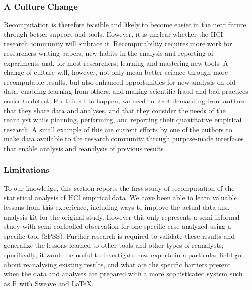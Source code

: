 \subsubsection{A Culture Change}
Recomputation is therefore feasible and likely to become easier in the near future through better support and tools. However, it is unclear whether the HCI research community will embrace it. Recomputability requires more work for researchers writing papers, new habits in the analysis and reporting of experiments and, for most researchers, learning and mastering new tools. A change of culture will, however, not only mean better science through more recomputable results, but also enhanced opportunities for new analysis on old data, enabling learning from others, and making scientific fraud and bad practices easier to detect. For this all to happen, we need to start demanding from authors that they share data and analyses, and that they consider the needs of the reanalyst while planning, performing, and reporting their quantitative empirical research. A small example of this are current efforts by one of the authors to make data available to the research community through purpose-made interfaces that enable analysis and reanalysis of previous results \cite{Grijincu:2014}. 

\subsubsection{Limitations}
To our knowledge, this section reports the first study of recomputation of the statistical analysis of HCI empirical data. We have been able to learn valuable lessons from this experience, including ways to improve the actual data and analysis kit for the original study. However this only represents a semi-informal study with semi-controlled observation for one specific case analyzed using a specific tool (SPSS). Further research is required to validate these results and generalize the lessons learned to other tools and other types of reanalysts; specifically, it would be useful to investigate how experts in a particular field go about reanalysing existing results, and what are the specific barriers present when the data and analyses are prepared with a more sophisticated system such as R with Sweave and \LaTeX.

